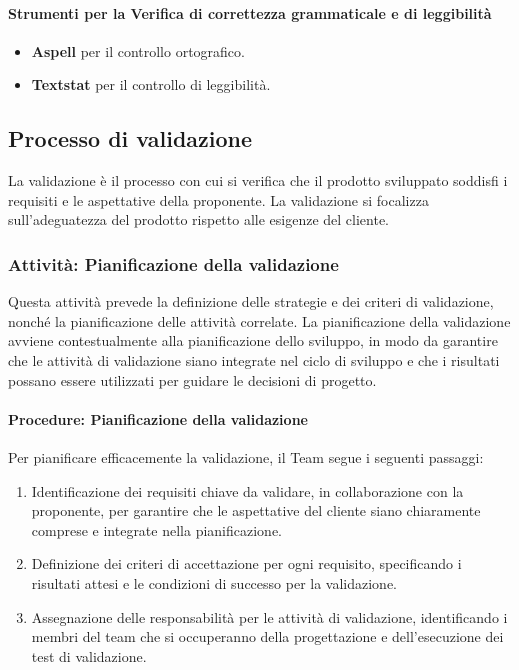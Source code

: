 \documentclass[a4paper,12pt]{article}
\begin{document}
\paragraph{Strumenti per la Verifica di correttezza grammaticale e di leggibilità}
\begin{itemize}
    \item \textbf{Aspell} per il controllo ortografico.
    \item \textbf{Textstat} per il controllo di leggibilità.
\end{itemize}

\subsection{Processo di validazione}
La validazione è il processo con cui si verifica che il prodotto sviluppato soddisfi i requisiti e le aspettative della proponente.
 La validazione si focalizza sull'adeguatezza del prodotto rispetto alle esigenze del cliente.

\subsubsection{Attività: Pianificazione della validazione}
Questa attività prevede la definizione delle strategie e dei criteri di validazione, nonché la pianificazione delle attività correlate. 
La pianificazione della validazione avviene contestualmente alla pianificazione dello sviluppo, in modo da garantire che le attività di 
validazione siano integrate nel ciclo di sviluppo e che i risultati possano essere utilizzati per guidare le decisioni di progetto.

\paragraph{Procedure: Pianificazione della validazione}
Per pianificare efficacemente la validazione, il Team segue i seguenti passaggi:
\begin{enumerate}
    \item Identificazione dei requisiti chiave da validare, in collaborazione con la proponente, per garantire che le aspettative del cliente siano chiaramente comprese e integrate nella pianificazione.
    \item Definizione dei criteri di accettazione per ogni requisito, specificando i risultati attesi e le condizioni di successo per la validazione.
    \item Assegnazione delle responsabilità per le attività di validazione, identificando i membri del team che si occuperanno della progettazione e dell'esecuzione dei test di validazione.
\end{enumerate}
\end{document}
